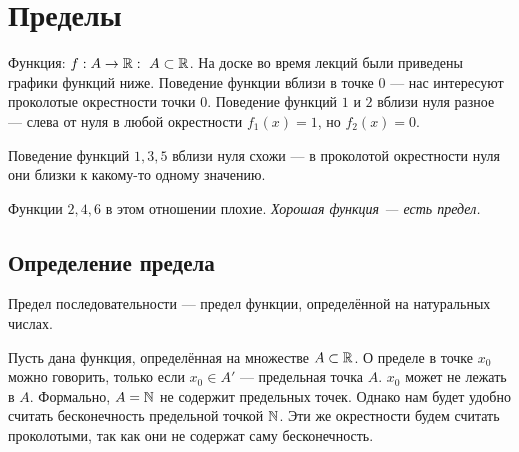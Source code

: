 \documentclass[a4paper]{report}
\begin{document}
    \section{Пределы}
    Функция: $f : A \rightarrow \mathbb{R}: ~ A \subset \mathbb{R}$.
    На доске во время лекций были приведены графики функций ниже.
    \numbers{
        \item $f(x) = \switch{1,&x \ne 0\\0,& x = 0}$.
        \definition[Характеристическая функция $B \subset \R$]{$\chi_B(x) = \switch{1, &x \in B \\ 0, &x \notin B }$.}
        \item $f(x) = \chi_{[0; 1)}$.
        \item $f(x) = x$.
        \item Функция Дирихле $D = \chi_\Q$.
        \item $f(x) = \chi_{\{0\} \cup [1; 2]}$.
        \item $f(x) = \switch{\sin\left(\frac{1}{x}\right),&x \ne 0\\ 10, &x = 0}$.
    }
    Поведение функции вблизи в точке $0$ --- нас интересуют проколотые окрестности точки $0$.
    Поведение функций $1$ и $2$ вблизи нуля разное --- слева от нуля в любой окрестности $f_1(x) = 1$, но $f_2(x) = 0$.

    Поведение функций $1, 3, 5$ вблизи нуля схожи --- в проколотой окрестности нуля они близки к какому-то одному значению.

    Функции $2, 4, 6$ в этом отношении плохие.
    \emph{Хорошая функция --- есть предел.}

    \subsection{Определение предела}
    Предел последовательности --- предел функции, определённой на натуральных числах.

    Пусть дана функция, определённая на множестве $A \subset \mathbb{R}$.
    О пределе в точке $x_0$ можно говорить, только если $x_0 \in A'$ --- предельная точка $A$. $x_0$ может не лежать в $A$.
    Формально, $A = \mathbb{N}$ не содержит предельных точек.
    Однако нам будет удобно считать бесконечность предельной точкой $\mathbb{N}$.
    Эти же окрестности будем считать проколотыми, так как они не содержат саму бесконечность.
\end{document}
